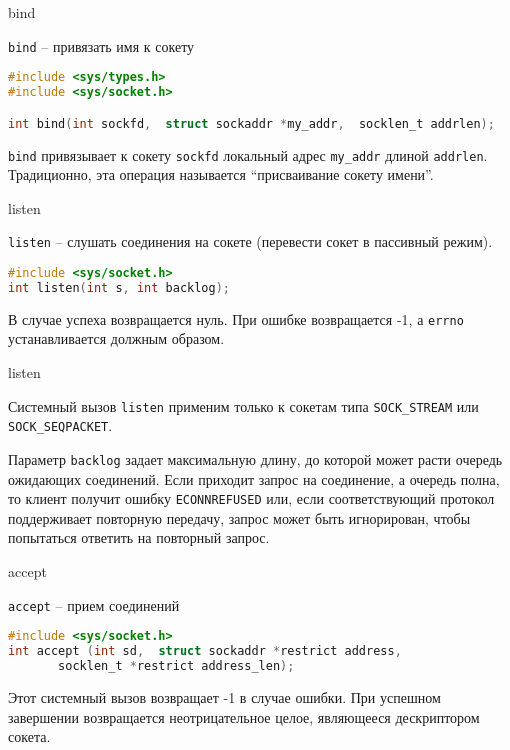 \begin{frame}[fragile]{bind}

{\tt bind} -- привязать имя к сокету
\scriptsize\begin{lstlisting}[language=C]
#include <sys/types.h>
#include <sys/socket.h>

int bind(int sockfd,  struct sockaddr *my_addr,  socklen_t addrlen);
\end{lstlisting}
{\tt bind} привязывает  к  сокету  {\tt sockfd} локальный адрес {\tt my\_addr} длиной {\tt addrlen}.  Традиционно, эта операция называется ``присваивание сокету имени''.
\end{frame}

\begin{frame}[fragile]{listen}

{\tt listen} -- слушать соединения на сокете (перевести сокет в пассивный режим).

\scriptsize\begin{lstlisting}[language=C]
#include <sys/socket.h> 
int listen(int s, int backlog);   
\end{lstlisting}
В случае успеха возвращается нуль. 
При ошибке возвращается -1, а {\tt errno} устанавливается должным образом.
\end{frame}

\begin{frame}{listen}

Системный вызов {\tt listen} применим 
только к сокетам типа {\tt SOCK\_STREAM} или {\tt SOCK\_SEQPACKET}.

Параметр {\tt backlog} задает максимальную длину, до которой может расти очередь 
ожидающих соединений. Если приходит запрос на соединение, а очередь полна,
то клиент получит ошибку {\tt ECONNREFUSED} или, если соответствующий
протокол поддерживает повторную передачу, запрос может быть игнорирован,
чтобы попытаться ответить на повторный запрос.   
\end{frame}

\begin{frame}[fragile]{accept}

{\tt accept} -- прием соединений
\scriptsize\begin{lstlisting}[language=C]
#include <sys/socket.h>
int accept (int sd,  struct sockaddr *restrict address, 
       socklen_t *restrict address_len);
\end{lstlisting}
Этот системный вызов возвращает -1 в случае  ошибки.   При  успешном  завершении  возвращается  неотрицательное целое,  являющееся дескриптором сокета.
\end{frame}

